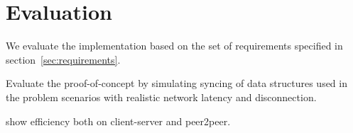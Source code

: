 
\chapter{Evaluation}\label{evaluation}

We evaluate the implementation based on the set of requirements specified in section~\ref{sec:requirements}.

Evaluate the proof-of-concept by simulating syncing of data structures
used in the problem scenarios with realistic network latency and
disconnection.

show efficiency both on client-server and peer2peer.